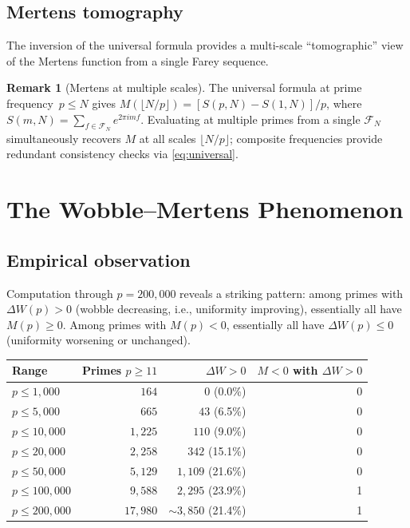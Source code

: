 \documentclass[11pt]{article}
\theoremstyle{definition}
\newtheorem{remark}[theorem]{Remark}
\newcommand{\F}{\mathcal{F}}
\begin{document}
\subsection{Mertens tomography}

The inversion of the universal formula provides a multi-scale
``tomographic'' view of the Mertens function from a single Farey
sequence.

\begin{remark}[Mertens at multiple scales]
The universal formula at prime frequency~$p \le N$ gives
$M(\lfloor N/p \rfloor) = [S(p,N) - S(1,N)]/p$,
where $S(m,N) = \sum_{f \in \F_N} e^{2\pi imf}$.
Evaluating at multiple primes from a single $\F_N$ simultaneously
recovers $M$ at all scales $\lfloor N/p \rfloor$; composite
frequencies provide redundant consistency checks via
\eqref{eq:universal}.
\end{remark}


\section{The Wobble--Mertens Phenomenon}\label{sec:phenomenon}

\subsection{Empirical observation}

Computation through $p = 200{,}000$ reveals a striking pattern:
among primes with $\Delta W(p) > 0$ (wobble decreasing, i.e.,
uniformity improving), essentially all have $M(p) \ge 0$.  Among
primes with $M(p) < 0$, essentially all have $\Delta W(p) \le 0$
(uniformity worsening or unchanged).

\begin{center}
\begin{tabular}{lrrr}
\toprule
Range & Primes $p \ge 11$ & $\Delta W > 0$ & $M < 0$ with $\Delta W > 0$ \\
\midrule
$p \le 1{,}000$ & $164$ & $0$ (0.0\%) & 0 \\
$p \le 5{,}000$ & $665$ & $43$ (6.5\%) & 0 \\
$p \le 10{,}000$ & $1{,}225$ & $110$ (9.0\%) & 0 \\
$p \le 20{,}000$ & $2{,}258$ & $342$ (15.1\%) & 0 \\
$p \le 50{,}000$ & $5{,}129$ & $1{,}109$ (21.6\%) & 0 \\
$p \le 100{,}000$ & $9{,}588$ & $2{,}295$ (23.9\%) & 1 \\
$p \le 200{,}000$ & $17{,}980$ & ${\sim}3{,}850$ (21.4\%) & 1 \\
\bottomrule
\end{tabular}
\end{center}
\end{document}
